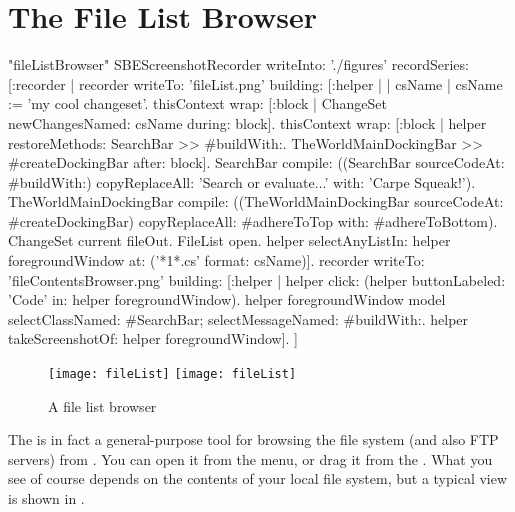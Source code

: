 \documentclass[a4paper,10pt,twoside]{book}
\begin{document}
\section{The File List Browser}

\begin{ExecuteSmalltalkScript}"fileListBrowser"
SBEScreenshotRecorder writeInto: './figures' recordSeries: [:recorder |
	recorder writeTo: 'fileList.png' building: [:helper |
		| csName |
		csName := 'my cool changeset'.
		thisContext wrap: [:block | ChangeSet newChangesNamed: csName during: block].
		thisContext wrap: [:block | helper restoreMethods: {SearchBar >> #buildWith:. TheWorldMainDockingBar >> #createDockingBar} after: block].
		SearchBar compile: ((SearchBar sourceCodeAt: #buildWith:)
			copyReplaceAll: 'Search or evaluate...' with: 'Carpe Squeak!').
		TheWorldMainDockingBar compile: ((TheWorldMainDockingBar sourceCodeAt: #createDockingBar)
			copyReplaceAll: #adhereToTop with: #adhereToBottom).
		ChangeSet current fileOut.
		FileList open.
		helper selectAnyListIn: helper foregroundWindow at: ('*{1}*.cs' format: {csName})].
	recorder writeTo: 'fileContentsBrowser.png' building: [:helper |
		helper click: (helper buttonLabeled: 'Code' in: helper foregroundWindow).
		helper foregroundWindow model
			selectClassNamed: #SearchBar;
			selectMessageNamed: #buildWith:.
		helper takeScreenshotOf: helper foregroundWindow].
]
\end{ExecuteSmalltalkScript}
\begin{figure}[btp]
	\begin{center}
	\ifluluelse
		{\texttt{[image: fileList]}}
		{\texttt{[image: fileList]}}
	\end{center}
	\caption{A file list browser}
	\label{fig:fileList}
\end{figure}

The  is in fact a general-purpose tool for browsing the file system (and also FTP servers) from \sq. 
You can open it from the  menu, or drag it from the \toolsflapind.
What you see of course depends on the contents of your local file system, but a typical view is shown in .
\end{document}
